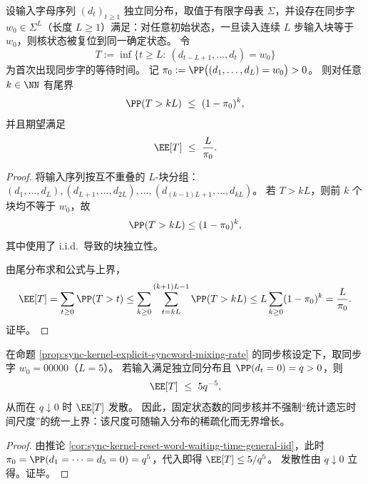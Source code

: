 \begin{corollary}[同步字等待时间的尾界与期望界（一般 i.i.d.\ 输入）]\label{cor:sync-kernel-reset-word-waiting-time-general-iid}
设输入字母序列 \((d_t)_{t\ge 1}\) 独立同分布，取值于有限字母表 \(\Sigma\)，并设存在同步字 \(w_0\in\Sigma^{L}\)（长度 \(L\ge 1\)）满足：对任意初始状态，一旦读入连续 \(L\) 步输入块等于 \(w_0\)，则核状态被复位到同一确定状态。
令
\[
T:=\inf\{t\ge L:\ (d_{t-L+1},\dots,d_t)=w_0\}
\]
为首次出现同步字的等待时间。
记
\(
\pi_0:=\PP\bigl((d_1,\dots,d_L)=w_0\bigr)>0
\)。
则对任意 \(k\in\NN\) 有尾界
\[
\PP(T>kL)\ \le\ (1-\pi_0)^{k},
\]
并且期望满足
\[
\EE[T]\ \le\ \frac{L}{\pi_0}.
\]
\end{corollary}
\begin{proof}
将输入序列按互不重叠的 \(L\)-块分组：
\((d_1,\dots,d_L),(d_{L+1},\dots,d_{2L}),\dots,(d_{(k-1)L+1},\dots,d_{kL})\)。
若 \(T>kL\)，则前 \(k\) 个块均不等于 \(w_0\)，故
\[
\PP(T>kL)\le (1-\pi_0)^k,
\]
其中使用了 i.i.d.\ 导致的块独立性。
\par
由尾分布求和公式与上界，
\[
\EE[T]=\sum_{t\ge 0}\PP(T>t)
\le \sum_{k\ge 0}\sum_{t=kL}^{(k+1)L-1}\PP(T>kL)
\le L\sum_{k\ge 0}(1-\pi_0)^k
=\frac{L}{\pi_0}.
\]
证毕。
\end{proof}

\begin{corollary}[固定状态同步核的遗忘时间尺度可无界]\label{cor:sync-kernel-reset-time-unbounded-under-small-q}
在命题 \ref{prop:sync-kernel-explicit-syncword-mixing-rate} 的同步核设定下，取同步字 \(w_0=00000\)（\(L=5\)）。
若输入满足独立同分布且 \(\PP(d_t=0)=q>0\)，则
\[
\EE[T]\ \le\ 5q^{-5},
\]
从而在 \(q\downarrow 0\) 时 \(\EE[T]\) 发散。
因此，固定状态数的同步核并不强制“统计遗忘时间尺度”的统一上界：该尺度可随输入分布的稀疏化而无界增长。
\end{corollary}
\begin{proof}
由推论 \ref{cor:sync-kernel-reset-word-waiting-time-general-iid}，此时
\(
\pi_0=\PP(d_1=\cdots=d_5=0)=q^5
\)，代入即得 \(\EE[T]\le 5/q^5\)。
发散性由 \(q\downarrow 0\) 立得。证毕。
\end{proof}
